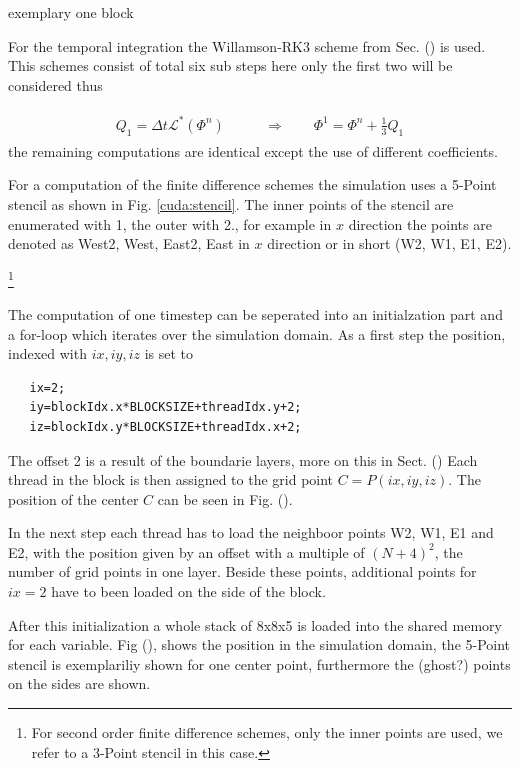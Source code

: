 exemplary one block

For the temporal integration the Willamson-RK3 scheme from Sec. () is used.
This schemes consist of total  six sub steps here only the first two will be considered thus

\begin{align}
    \begin{split}
    Q_1 = \Delta t \mathcal{L}^*\left(\Phi^n\right)\qquad &\Rightarrow \qquad \Phi^{1} = \Phi^n + \frac{1}{3}Q_1
    \end{split}
\end{align}
the remaining computations are identical except the use of different coefficients.

For a computation of the finite difference schemes the simulation uses a 5-Point stencil as shown in Fig. \ref{cuda:stencil}.
The inner points of the stencil are enumerated with 1, the outer with 2., for example in $x$ direction the points are denoted as West2,
West, East2, East in $x$ direction or in short (W2, W1, E1, E2).

\footnote{For second order finite difference schemes, only the inner points are used, we refer to a 3-Point stencil in this case.}


The computation of one timestep can be seperated into an initialzation part and a for-loop which iterates over the simulation domain.
As a first step the position, indexed with $ix, iy, iz$ is set to

\begin{verbatim}
   ix=2;
   iy=blockIdx.x*BLOCKSIZE+threadIdx.y+2;
   iz=blockIdx.y*BLOCKSIZE+threadIdx.x+2;
\end{verbatim}

The offset 2 is a result  of the boundarie layers, more on this in Sect. ()
Each thread in the block is then assigned to the grid point $C = P(ix, iy, iz)$.
The position of the center $C$ can be seen in Fig. ().

In the next step each thread has to load the neighboor points W2, W1, E1 and E2,
with the position given by an offset with a multiple of $(N+4)^2$, the number of grid points in one layer.
Beside these points, additional points for $ix=2$ have to been loaded on the side of the block.

After this initialization a whole stack of 8x8x5 is loaded into the shared memory for each variable.
Fig (), shows the position in the simulation domain, the 5-Point stencil is exemplariliy shown for one center point,
furthermore the (ghost?) points on the sides are shown.

